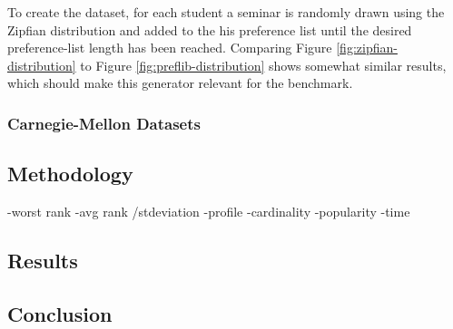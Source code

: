 To create the dataset, for each student a seminar is randomly drawn using the Zipfian distribution and added to the his preference list until the desired preference-list length has been reached. Comparing Figure \ref{fig:zipfian-distribution} to Figure \ref{fig:preflib-distribution} shows somewhat similar results, which should make this generator relevant for the benchmark. 

\subsubsection{Carnegie-Mellon Datasets}

\subsection{Methodology}
-worst rank
-avg rank /stdeviation
-profile
-cardinality
-popularity
-time

\subsection{Results}

\subsection{Conclusion}